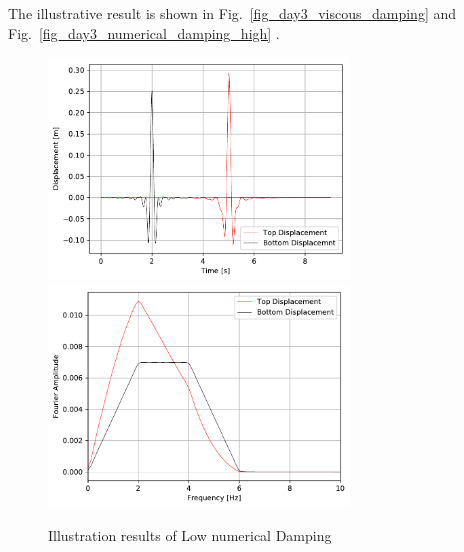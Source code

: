 The illustrative result is shown in Fig.~\ref{fig_day3_viscous_damping} and Fig.~\ref{fig_day3_numerical_damping_high} .

\begin{figure}[H]
  \centering
  \includegraphics[width = 8cm]{./Figure-files/Day3/Numerical_Damping_Example/newmark06Displacement.pdf}
  \includegraphics[width = 8cm]{./Figure-files/Day3/Numerical_Damping_Example/newmark06Displacement_Spectrum.pdf}
  \caption{Illustration results of Low numerical Damping}
  \label{fig_day3_numerical_damping}
\end{figure}

